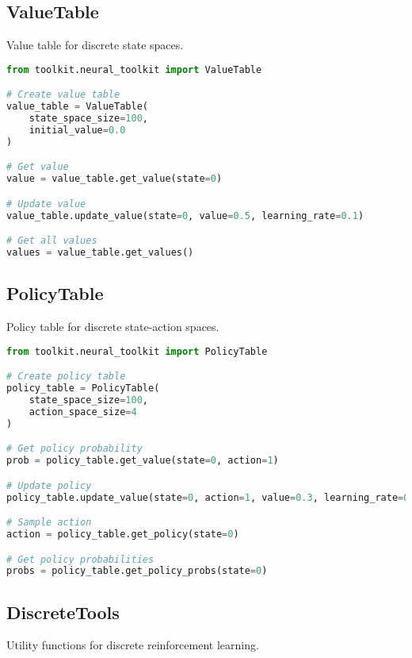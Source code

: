 \subsection{ValueTable}

Value table for discrete state spaces.

\begin{lstlisting}[language=python, caption=Value Table Usage]
from toolkit.neural_toolkit import ValueTable

# Create value table
value_table = ValueTable(
    state_space_size=100,
    initial_value=0.0
)

# Get value
value = value_table.get_value(state=0)

# Update value
value_table.update_value(state=0, value=0.5, learning_rate=0.1)

# Get all values
values = value_table.get_values()
\end{lstlisting}

\subsection{PolicyTable}

Policy table for discrete state-action spaces.

\begin{lstlisting}[language=python, caption=Policy Table Usage]
from toolkit.neural_toolkit import PolicyTable

# Create policy table
policy_table = PolicyTable(
    state_space_size=100,
    action_space_size=4
)

# Get policy probability
prob = policy_table.get_value(state=0, action=1)

# Update policy
policy_table.update_value(state=0, action=1, value=0.3, learning_rate=0.1)

# Sample action
action = policy_table.get_policy(state=0)

# Get policy probabilities
probs = policy_table.get_policy_probs(state=0)
\end{lstlisting}

\subsection{DiscreteTools}

Utility functions for discrete reinforcement learning.

